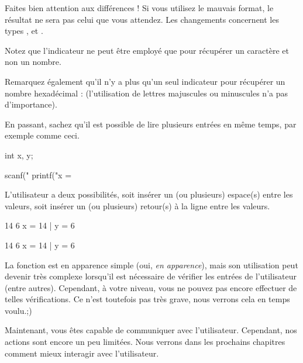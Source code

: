 \begin{erreurbox}
Faites bien attention aux différences ! Si
vous utilisez le mauvais format, le résultat ne sera pas celui que vous
attendez. Les changements concernent les types ,
 et .
\end{erreurbox}

\begin{infobox}
Notez que l'indicateur  ne
peut être employé que pour récupérer un caractère et non un nombre.
\end{infobox}

\begin{infobox}
Remarquez également qu'il n'y a plus
qu'un seul indicateur pour récupérer un nombre hexadécimal : 
(l'utilisation de lettres majuscules ou minuscules n'a pas
d'importance).
\end{infobox}

En passant, sachez qu'il est possible de lire plusieurs entrées en même
temps, par exemple comme ceci.


\begin{C}
int x, y;

 scanf("%
 printf("x = %
\end{C}


L'utilisateur a deux possibilités, soit insérer un (ou plusieurs)
espace(s) entre les valeurs, soit insérer un (ou plusieurs) retour(s) à
la ligne entre les valeurs.

\begin{C}
14
6
x = 14 | y = 6
\end{C}

\begin{C}
14 6
x = 14 | y = 6
\end{C}

La fonction  est en apparence simple (oui, \emph{en
apparence}), mais son utilisation peut devenir très complexe lorsqu'il
est nécessaire de vérifier les entrées de l'utilisateur (entre autres).
Cependant, à votre niveau, vous ne pouvez pas encore effectuer de telles
vérifications. Ce n'est toutefois pas très grave, nous verrons cela en
temps voulu.;)

\hrulefill

Maintenant, vous êtes capable de communiquer avec l'utilisateur.
Cependant, nos actions sont encore un peu limitées. Nous verrons dans
les prochains chapitres comment mieux interagir avec
l'utilisateur.